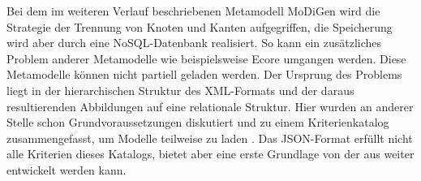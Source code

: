 Bei dem im weiteren Verlauf beschriebenen Metamodell MoDiGen wird die Strategie der Trennung von Knoten und Kanten aufgegriffen, die Speicherung wird aber durch eine NoSQL-Datenbank realisiert. So kann ein zusätzliches Problem anderer Metamodelle wie beispielsweise Ecore umgangen werden. Diese Metamodelle können nicht partiell geladen werden. Der Ursprung des Problems liegt in der hierarchischen Struktur des XML-Formats und der daraus resultierenden Abbildungen auf eine relationale Struktur. Hier wurden an anderer Stelle schon Grundvoraussetzungen diskutiert und zu einem Kriterienkatalog zusammengefasst, um Modelle teilweise zu laden \cite{kolovos2013research}. Das JSON-Format erfüllt nicht alle Kriterien dieses Katalogs, bietet aber eine erste Grundlage von der aus weiter entwickelt werden kann.